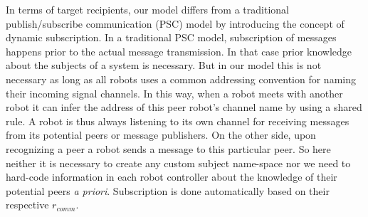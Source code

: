 In terms of target recipients, our model differs from a traditional publish/subscribe communication (PSC) model by introducing the concept of dynamic subscription. In a traditional PSC model, subscription of messages happens prior to the actual message transmission. In that case prior knowledge about the subjects of a system is necessary. But in our model this is not necessary as long as all robots uses a common addressing convention for naming their incoming signal channels. In this way, when a robot meets with another robot it can infer the address of this peer robot's channel name by using a shared rule. A robot is thus always listening to its own channel for receiving messages from its potential peers or message publishers. On the other side, upon recognizing a peer a robot sends a message to this particular peer. So here neither it is necessary to create any custom subject name-space  \cite{Gerkey+2001} nor we need to hard-code information in each robot controller about the knowledge of their potential peers {\em a priori}. Subscription is done automatically based on their respective $r_{comm}$.
%
